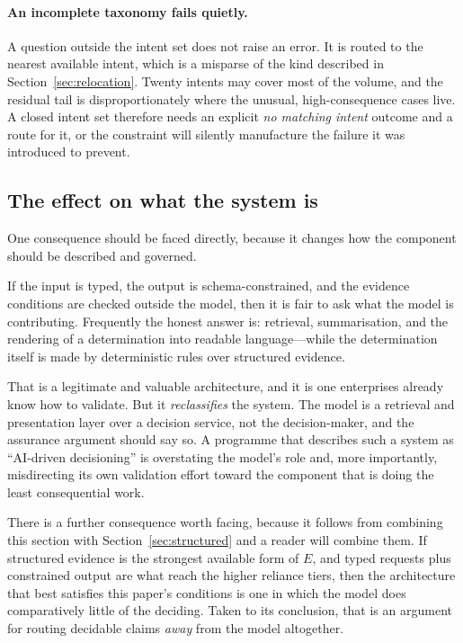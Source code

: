 \paragraph{An incomplete taxonomy fails quietly.} A question outside the intent set
does not raise an error. It is routed to the nearest available intent, which is a
misparse of the kind described in Section~\ref{sec:relocation}. Twenty intents may
cover most of the volume, and the residual tail is disproportionately where the
unusual, high-consequence cases live. A closed intent set therefore needs an explicit
\emph{no matching intent} outcome and a route for it, or the constraint will silently
manufacture the failure it was introduced to prevent.

\subsection{The effect on what the system is}

One consequence should be faced directly, because it changes how the component should
be described and governed.

If the input is typed, the output is schema-constrained, and the evidence conditions
are checked outside the model, then it is fair to ask what the model is contributing.
Frequently the honest answer is: retrieval, summarisation, and the rendering of a
determination into readable language---while the determination itself is made by
deterministic rules over structured evidence.

That is a legitimate and valuable architecture, and it is one enterprises already know
how to validate. But it \emph{reclassifies} the system. The model is a retrieval and
presentation layer over a decision service, not the decision-maker, and the assurance
argument should say so. A programme that describes such a system as ``AI-driven
decisioning'' is overstating the model's role and, more importantly, misdirecting its
own validation effort toward the component that is doing the least consequential work.

There is a further consequence worth facing, because it follows from combining this
section with Section~\ref{sec:structured} and a reader will combine them. If structured
evidence is the strongest available form of $E$, and typed requests plus constrained
output are what reach the higher reliance tiers, then the architecture that best
satisfies this paper's conditions is one in which the model does comparatively little of
the deciding. Taken to its conclusion, that is an argument for routing decidable claims
\emph{away} from the model altogether.

